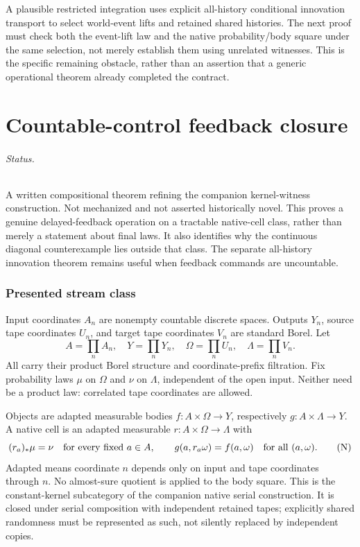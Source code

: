 \documentclass[11pt]{article}
\begin{document}
A plausible restricted integration uses explicit all-history conditional innovation transport to select world-event lifts and retained shared histories. The next proof must check both the event-lift law and the native probability/body square under the same selection, not merely establish them using unrelated witnesses. This is the specific remaining obstacle, rather than an assertion that a generic operational theorem already completed the contract.


\part{Countable-control feedback closure}

\paragraph{Status.} A written compositional theorem refining the companion kernel-witness construction. Not mechanized and not asserted historically novel. This proves a genuine delayed-feedback operation on a tractable native-cell class, rather than merely a statement about final laws. It also identifies why the continuous diagonal counterexample lies outside that class. The separate all-history innovation theorem remains useful when feedback commands are uncountable.

\section{Presented stream class}
Input coordinates $A_n$ are nonempty countable discrete spaces. Outputs $Y_n$, source tape coordinates $U_n$, and target tape coordinates $V_n$ are standard Borel. Let
\[
 A=\prod_n A_n,\quad Y=\prod_nY_n,\quad
 \Omega=\prod_n U_n,\quad\Lambda=\prod_n V_n.
\]
All carry their product Borel structure and coordinate-prefix filtration. Fix probability laws $\mu$ on $\Omega$ and $\nu$ on $\Lambda$, independent of the open input. Neither need be a product law: correlated tape coordinates are allowed.

Objects are adapted measurable bodies $f:A\times\Omega\to Y$, respectively $g:A\times\Lambda\to Y$. A native cell is an adapted measurable $r:A\times\Omega\to\Lambda$ with
\[
 (r_a)_*\mu=\nu\quad\hbox{for every fixed }a\in A,
 \qquad g(a,r_a\omega)=f(a,\omega)\quad\hbox{for all }(a,\omega).
 \tag{N}
\]
Adapted means coordinate $n$ depends only on input and tape coordinates through $n$. No almost-sure quotient is applied to the body square. This is the constant-kernel subcategory of the companion native serial construction. It is closed under serial composition with independent retained tapes; explicitly shared randomness must be represented as such, not silently replaced by independent copies.
\end{document}

